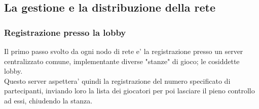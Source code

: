 \subsection{La gestione e la distribuzione della rete}
	\subsubsection{Registrazione presso la lobby}
		Il primo passo svolto da ogni nodo di rete e' la registrazione
		presso un server centralizzato comune, implementante diverse
		"stanze" di gioco; le cosiddette lobby.\\
		Questo server aspettera' quindi la registrazione del numero
		specificato di partecipanti, inviando loro la lista dei
		giocatori per poi lasciare il pieno controllo
		ad essi, chiudendo la stanza.

